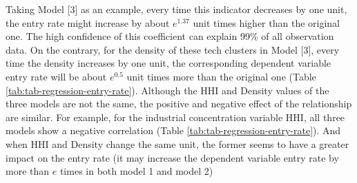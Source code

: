 \documentclass[
  12pt,
  oneside]{book}
\begin{document}
Taking Model {[}3{]} as an example, every time this indicator decreases by one unit, the entry rate might increase by about \(e^{1.37}\) unit times higher than the original one. The high confidence of this coefficient can explain 99\% of all observation data. On the contrary, for the density of these tech clusters in Model {[}3{]}, every time the density increases by one unit, the corresponding dependent variable entry rate will be about \(e^{0.5}\) unit times more than the original one (Table \ref{tab:tab-regression-entry-rate}). Although the HHI and Density values of the three models are not the same, the positive and negative effect of the relationship are similar. For example, for the industrial concentration variable HHI, all three models show a negative correlation (Table \ref{tab:tab-regression-entry-rate}). And when HHI and Density change the same unit, the former seems to have a greater impact on the entry rate (it may increase the dependent variable entry rate by more than \(e\) times in both model 1 and model 2)
\end{document}
